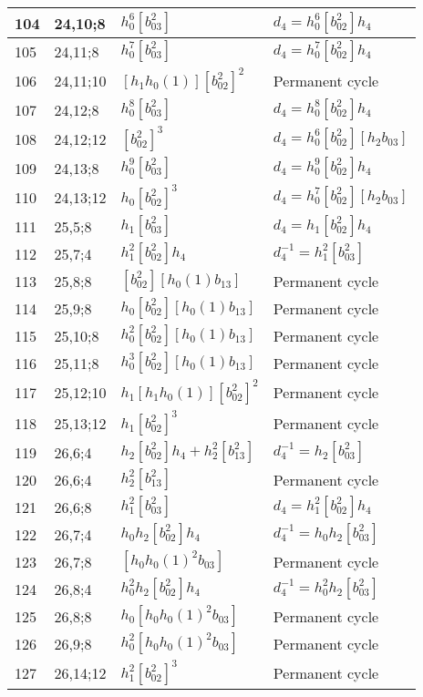 \documentclass{article}
\begin{document}
\begin{longtable}{|l|l|>{\raggedright\arraybackslash}p{6cm}|>{\raggedright\arraybackslash}p{6cm}|}
104 & 24,10;8 & $h_0^6[b_{03}^2]$ &$d_{4}=h_0^6[b_{02}^2]h_4$\\
\hline
105 & 24,11;8 & $h_0^7[b_{03}^2]$ &$d_{4}=h_0^7[b_{02}^2]h_4$\\
\hline
106 & 24,11;10 & $[h_1h_0(1)][b_{02}^2]^2$ & Permanent cycle\\
\hline
107 & 24,12;8 & $h_0^8[b_{03}^2]$ &$d_{4}=h_0^8[b_{02}^2]h_4$\\
\hline
108 & 24,12;12 & $[b_{02}^2]^3$ &$d_{4}=h_0^6[b_{02}^2][h_2b_{03}]$\\
\hline
109 & 24,13;8 & $h_0^9[b_{03}^2]$ &$d_{4}=h_0^9[b_{02}^2]h_4$\\
\hline
110 & 24,13;12 & $h_0[b_{02}^2]^3$ &$d_{4}=h_0^7[b_{02}^2][h_2b_{03}]$\\
\hline
111 & 25,5;8 & $h_1[b_{03}^2]$ &$d_{4}=h_1[b_{02}^2]h_4$\\
\hline
112 & 25,7;4 & $h_1^2[b_{02}^2]h_4$ & $d_{4}^{-1}=h_1^2[b_{03}^2]$\\
\hline
113 & 25,8;8 & $[b_{02}^2][h_0(1)b_{13}]$ & Permanent cycle\\
\hline
114 & 25,9;8 & $h_0[b_{02}^2][h_0(1)b_{13}]$ & Permanent cycle\\
\hline
115 & 25,10;8 & $h_0^2[b_{02}^2][h_0(1)b_{13}]$ & Permanent cycle\\
\hline
116 & 25,11;8 & $h_0^3[b_{02}^2][h_0(1)b_{13}]$ & Permanent cycle\\
\hline
117 & 25,12;10 & $h_1[h_1h_0(1)][b_{02}^2]^2$ & Permanent cycle\\
\hline
118 & 25,13;12 & $h_1[b_{02}^2]^3$ & Permanent cycle\\
\hline
119 & 26,6;4 & $h_2[b_{02}^2]h_4 + h_2^2[b_{13}^2]$ & $d_{4}^{-1}=h_2[b_{03}^2]$\\
120 & 26,6;4 & $h_2^2[b_{13}^2]$ & Permanent cycle\\
\hline
121 & 26,6;8 & $h_1^2[b_{03}^2]$ &$d_{4}=h_1^2[b_{02}^2]h_4$\\
\hline
122 & 26,7;4 & $h_0h_2[b_{02}^2]h_4$ & $d_{4}^{-1}=h_0h_2[b_{03}^2]$\\
\hline
123 & 26,7;8 & $[h_0h_0(1)^2b_{03}]$ & Permanent cycle\\
\hline
124 & 26,8;4 & $h_0^2h_2[b_{02}^2]h_4$ & $d_{4}^{-1}=h_0^2h_2[b_{03}^2]$\\
\hline
125 & 26,8;8 & $h_0[h_0h_0(1)^2b_{03}]$ & Permanent cycle\\
\hline
126 & 26,9;8 & $h_0^2[h_0h_0(1)^2b_{03}]$ & Permanent cycle\\
\hline
127 & 26,14;12 & $h_1^2[b_{02}^2]^3$ & Permanent cycle\\

\end{longtable}
\end{document}
